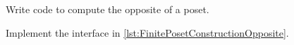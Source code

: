 
\begin{codeexercise}
    Write code to compute the opposite of a poset.

    Implement the interface in \cref{lst:FinitePosetConstructionOpposite}.
\end{codeexercise}

